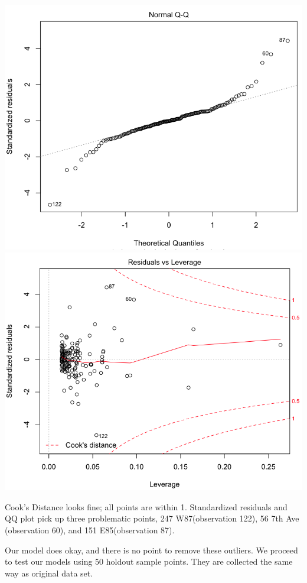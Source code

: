 \documentclass[a4 paper, 11 pt, twocolumn]{article}
\begin{document}
\begin{center}
\includegraphics[scale=0.3]{QQ4}
\includegraphics[scale=0.3]{CooksD4}
\end{center}
Cook's Distance looks fine; all points are within 1. Standardized residuals and QQ plot pick up three problematic points, 247 W87(observation 122), 56 7th Ave (observation 60), and 151 E85(observation 87).

Our model does okay, and there is no point to remove these outliers. We proceed to test our models using 50 holdout sample points. They are collected the same way as original data set.
\end{document}
